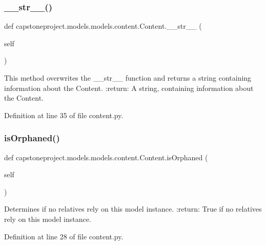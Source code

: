 \subsubsection{\texorpdfstring{\+\_\+\+\_\+str\+\_\+\+\_\+()}{\_\_str\_\_()}}
{\footnotesize\ttfamily def capstoneproject.\+models.\+models.\+content.\+Content.\+\_\+\+\_\+str\+\_\+\+\_\+ (\begin{DoxyParamCaption}\item[{}]{self }\end{DoxyParamCaption})}

\begin{DoxyVerb}This method overwrites the __str__ function and
returns a string containing information about the Content.
:return: A string, containing information about the Content.
\end{DoxyVerb}
 

Definition at line 35 of file content.\+py.

\mbox{\label{classcapstoneproject_1_1models_1_1models_1_1content_1_1_content_acf1686cea94ff68e24d969a43b7ee453}} 
\subsubsection{\texorpdfstring{is\+Orphaned()}{isOrphaned()}}
{\footnotesize\ttfamily def capstoneproject.\+models.\+models.\+content.\+Content.\+is\+Orphaned (\begin{DoxyParamCaption}\item[{}]{self }\end{DoxyParamCaption})}

\begin{DoxyVerb}Determines if no relatives rely on this model instance.
:return: True if no relatives rely on this model instance.
\end{DoxyVerb}
 

Definition at line 28 of file content.\+py.

\mbox{\label{classcapstoneproject_1_1models_1_1models_1_1content_1_1_content_aef00f5f6aaba41b1b808ac8cf8327dd2}} 
